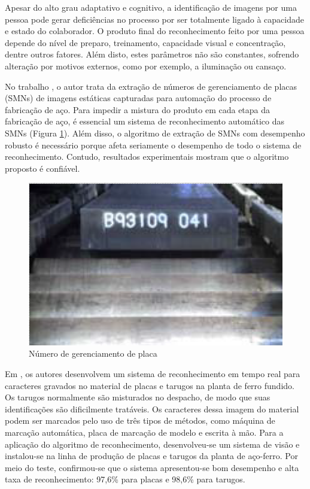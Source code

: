 Apesar do alto grau adaptativo e cognitivo, a identificação de imagens por uma pessoa pode gerar deficiências no processo por ser totalmente ligado à capacidade e estado do colaborador. O produto final do reconhecimento feito por uma pessoa depende do nível de preparo, treinamento, capacidade visual e concentração, dentre outros fatores. 
%
Além disto, estes parâmetros não são constantes, sofrendo alteração por motivos externos, como por exemplo, a iluminação ou cansaço. \cite{refbib2, refbib3}

No trabalho \cite{ref1}, o autor trata da extração de números de gerenciamento de placas (SMNs) de imagens estáticas capturadas para automação do processo de fabricação de aço. Para impedir a mistura do produto em cada etapa da fabricação de aço, é essencial um sistema de reconhecimento automático das SMNs (Figura \ref{fig:SMN}). Além disso, o algoritmo de extração de SMNs com desempenho robusto é necessário porque afeta seriamente o desempenho de todo o sistema de reconhecimento. Contudo, resultados experimentais mostram que o algoritmo proposto é confiável. 

\begin{figure}[htbp]
	\centering
	\includegraphics[width=0.5\linewidth]{figuras/Steel/SMN.png}
	\caption{Número de gerenciamento de placa}
	\label{fig:SMN}
\end{figure}


Em \cite{ref2}, os autores desenvolvem um sistema de reconhecimento em tempo real para caracteres gravados no material de placas e tarugos na planta de ferro fundido. 
%
Os tarugos normalmente são misturados no despacho, de modo que suas identificações são dificilmente tratáveis. Os caracteres dessa imagem do material podem ser marcados pelo uso de três tipos de métodos, como máquina de marcação automática, placa de marcação de modelo e escrita à mão. Para a aplicação do algoritmo de reconhecimento, desenvolveu-se um sistema de visão e instalou-se na linha de produção de placas e tarugos da planta de aço-ferro. Por meio do teste, confirmou-se que o sistema apresentou-se bom desempenho e alta taxa de reconhecimento: 97,6\% para placas e 98,6\% para tarugos.

